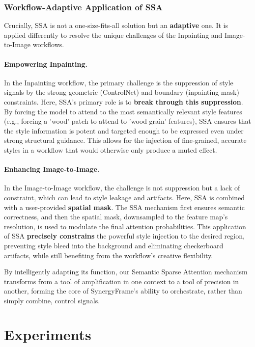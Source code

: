 \documentclass[letterpaper]{article} %
\begin{document}
\subsubsection{Workflow-Adaptive Application of SSA}
Crucially, SSA is not a one-size-fits-all solution but an \textbf{adaptive} one. It is applied differently to resolve the unique challenges of the Inpainting and Image-to-Image workflows.

\paragraph{Empowering Inpainting.} In the Inpainting workflow, the primary challenge is the suppression of style signals by the strong geometric (ControlNet) and boundary (inpainting mask) constraints. Here, SSA's primary role is to \textbf{break through this suppression}. By forcing the model to attend to the most semantically relevant style features (e.g., forcing a 'wood' patch to attend to 'wood grain' features), SSA ensures that the style information is potent and targeted enough to be expressed even under strong structural guidance. This allows for the injection of fine-grained, accurate styles in a workflow that would otherwise only produce a muted effect.

\paragraph{Enhancing Image-to-Image.} In the Image-to-Image workflow, the challenge is not suppression but a lack of constraint, which can lead to style leakage and artifacts. Here, SSA is combined with a user-provided \textbf{spatial mask}. The SSA mechanism first ensures semantic correctness, and then the spatial mask, downsampled to the feature map's resolution, is used to modulate the final attention probabilities. This application of SSA \textbf{precisely constrains} the powerful style injection to the desired region, preventing style bleed into the background and eliminating checkerboard artifacts, while still benefiting from the workflow's creative flexibility.

By intelligently adapting its function, our Semantic Sparse Attention mechanism transforms from a tool of amplification in one context to a tool of precision in another, forming the core of SynergyFrame's ability to orchestrate, rather than simply combine, control signals.

\section{Experiments}
\label{sec:experiments}
\end{document}
